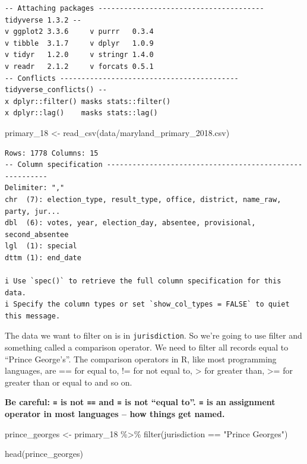 \documentclass[
  letterpaper,
  DIV=11,
  numbers=noendperiod]{scrreprt}
\newenvironment{Shaded}{\begin{snugshade}}{\end{snugshade}}
\newcommand{\FunctionTok}[1]{\textcolor[rgb]{0.28,0.35,0.67}{#1}}
\newcommand{\NormalTok}[1]{\textcolor[rgb]{0.00,0.23,0.31}{#1}}
\newcommand{\OtherTok}[1]{\textcolor[rgb]{0.00,0.23,0.31}{#1}}
\newcommand{\SpecialCharTok}[1]{\textcolor[rgb]{0.37,0.37,0.37}{#1}}
\newcommand{\StringTok}[1]{\textcolor[rgb]{0.13,0.47,0.30}{#1}}
\begin{document}
\begin{verbatim}
-- Attaching packages --------------------------------------- tidyverse 1.3.2 --
v ggplot2 3.3.6     v purrr   0.3.4
v tibble  3.1.7     v dplyr   1.0.9
v tidyr   1.2.0     v stringr 1.4.0
v readr   2.1.2     v forcats 0.5.1
-- Conflicts ------------------------------------------ tidyverse_conflicts() --
x dplyr::filter() masks stats::filter()
x dplyr::lag()    masks stats::lag()
\end{verbatim}

\begin{Shaded}
\begin{Highlighting}[]
\NormalTok{primary\_18 }\OtherTok{\textless{}{-}} \FunctionTok{read\_csv}\NormalTok{(}\StringTok{\textquotesingle{}data/maryland\_primary\_2018.csv\textquotesingle{}}\NormalTok{)}
\end{Highlighting}
\end{Shaded}

\begin{verbatim}
Rows: 1778 Columns: 15
-- Column specification --------------------------------------------------------
Delimiter: ","
chr  (7): election_type, result_type, office, district, name_raw, party, jur...
dbl  (6): votes, year, election_day, absentee, provisional, second_absentee
lgl  (1): special
dttm (1): end_date

i Use `spec()` to retrieve the full column specification for this data.
i Specify the column types or set `show_col_types = FALSE` to quiet this message.
\end{verbatim}

The data we want to filter on is in \texttt{jurisdiction}. So we're
going to use filter and something called a comparison operator. We need
to filter all records equal to ``Prince George's''. The comparison
operators in R, like most programming languages, are == for equal to, !=
for not equal to, \textgreater{} for greater than, \textgreater= for
greater than or equal to and so on.

\textbf{Be careful: \texttt{=} is not \texttt{==} and \texttt{=} is not
``equal to''. \texttt{=} is an assignment operator in most languages --
how things get named.}

\begin{Shaded}
\begin{Highlighting}[]
\NormalTok{prince\_georges }\OtherTok{\textless{}{-}}\NormalTok{ primary\_18 }\SpecialCharTok{\%\textgreater{}\%} \FunctionTok{filter}\NormalTok{(jurisdiction }\SpecialCharTok{==} \StringTok{"Prince George\textquotesingle{}s"}\NormalTok{)}

\FunctionTok{head}\NormalTok{(prince\_georges)}
\end{Highlighting}
\end{Shaded}
\end{document}
